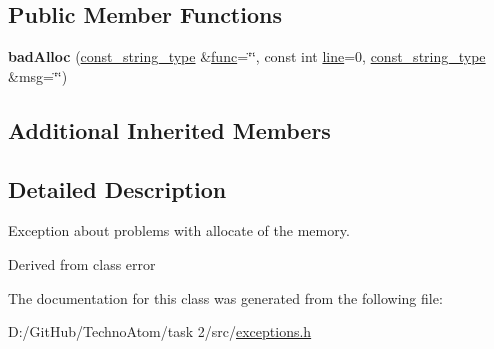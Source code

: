\subsection*{Public Member Functions}
\begin{DoxyCompactItemize}
\item 
\mbox{\label{classatom_1_1bad_alloc_afcf798fbb60d759728033cd30c01b0e8}} 
{\bfseries bad\+Alloc} (\hyperlink{classatom_1_1error_ac330e9fb7cedcf4a173c5eb156d7bdaf}{const\+\_\+string\+\_\+type} \&\hyperlink{classatom_1_1error_a0a70a92b1638bfe4be7972651ae0c5c8}{func}=\char`\"{}\char`\"{}, const int \hyperlink{classatom_1_1error_aa9443d1a458d0dc6086372444a58e8c6}{line}=0, \hyperlink{classatom_1_1error_ac330e9fb7cedcf4a173c5eb156d7bdaf}{const\+\_\+string\+\_\+type} \&msg=\char`\"{}\char`\"{})
\end{DoxyCompactItemize}
\subsection*{Additional Inherited Members}


\subsection{Detailed Description}
Exception about problems with allocate of the memory. 

Derived from class error 

The documentation for this class was generated from the following file\+:\begin{DoxyCompactItemize}
\item 
D\+:/\+Git\+Hub/\+Techno\+Atom/task 2/src/\hyperlink{exceptions_8h}{exceptions.\+h}\end{DoxyCompactItemize}
